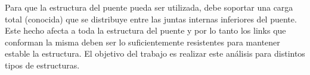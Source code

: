 Para que la estructura del puente pueda ser utilizada, debe soportar una carga total (conocida) que se distribuye entre 
las juntas internas inferiores del puente. Este hecho afecta a toda la estructura del puente y por lo tanto los links
que conforman la misma deben ser lo suficientemente resistentes para mantener estable la estructura. El objetivo del
trabajo es realizar este an\'alisis para distintos tipos de estructuras.
